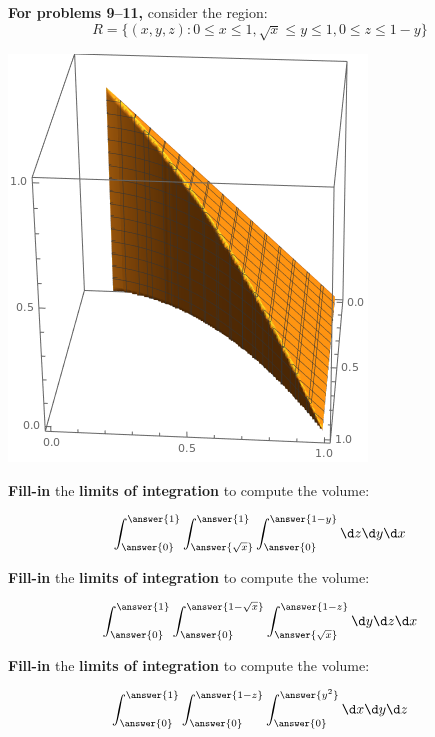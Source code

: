 \documentclass{ximera}
\begin{document}
\textbf{For problems 9--11,} consider the region:
\[
R = \{(x,y,z): 0\le x \le 1, \sqrt{x}\le y\le 1, 0 \le z \le 1-y\}
\]
\begin{image}[2in]
  \includegraphics{3DRectRegion.png}
\end{image}

\begin{problem}
  \textbf{Fill-in} the \textbf{limits of integration} to compute the volume:
  \begin{prompt}
  \[
  \int_{\answer{0}}^{\answer{1}}\int_{\answer{\sqrt{x}}}^{\answer{1}}\int_{\answer{0}}^{\answer{1-y}}\d z \d y \d x
  \]
  \end{prompt}
\end{problem}



\begin{problem}
  \textbf{Fill-in} the \textbf{limits of integration} to compute the volume:
  \begin{prompt}
  \[
  \int_{\answer{0}}^{\answer{1}}\int_{\answer{0}}^{\answer{1-\sqrt{x}}}\int_{\answer{\sqrt{x}}}^{\answer{1-z}}\d y \d z \d x
  \]
  \end{prompt}
\end{problem}

\begin{problem}
  \textbf{Fill-in} the \textbf{limits of integration} to compute the volume:
  \begin{prompt}
  \[
  \int_{\answer{0}}^{\answer{1}}\int_{\answer{0}}^{\answer{1-z}}\int_{\answer{0}}^{\answer{y^2}}\d x \d y \d z
  \]
  \end{prompt}
\end{problem}
\end{document}
